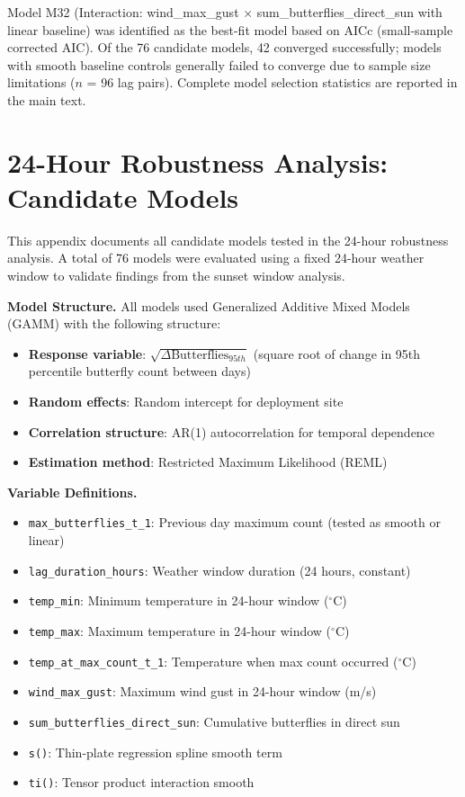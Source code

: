 \documentclass[insects,article,submit,pdftex,moreauthors]{Definitions/mdpi}
\begin{document}
\begin{appendix}
Model M32 (Interaction: wind\_max\_gust $\times$ sum\_butterflies\_direct\_sun with linear baseline) was identified as the best-fit model based on AICc (small-sample corrected AIC). Of the 76 candidate models, 42 converged successfully; models with smooth baseline controls generally failed to converge due to sample size limitations ($n$ = 96 lag pairs). Complete model selection statistics are reported in the main text.

\section{24-Hour Robustness Analysis: Candidate Models}
\label{app:24hr_models}

This appendix documents all candidate models tested in the 24-hour robustness analysis. A total of 76 models were evaluated using a fixed 24-hour weather window to validate findings from the sunset window analysis.

\textbf{Model Structure.}
All models used Generalized Additive Mixed Models (GAMM) with the following structure:
\begin{itemize}
\item \textbf{Response variable}: $\sqrt{\Delta\text{Butterflies}_{95th}}$ (square root of change in 95th percentile butterfly count between days)
\item \textbf{Random effects}: Random intercept for deployment site
\item \textbf{Correlation structure}: AR(1) autocorrelation for temporal dependence
\item \textbf{Estimation method}: Restricted Maximum Likelihood (REML)
\end{itemize}

\textbf{Variable Definitions.}
\begin{itemize}
\item \texttt{max\_butterflies\_t\_1}: Previous day maximum count (tested as smooth or linear)
\item \texttt{lag\_duration\_hours}: Weather window duration (24 hours, constant)
\item \texttt{temp\_min}: Minimum temperature in 24-hour window ($^\circ$C)
\item \texttt{temp\_max}: Maximum temperature in 24-hour window ($^\circ$C)
\item \texttt{temp\_at\_max\_count\_t\_1}: Temperature when max count occurred ($^\circ$C)
\item \texttt{wind\_max\_gust}: Maximum wind gust in 24-hour window (m/s)
\item \texttt{sum\_butterflies\_direct\_sun}: Cumulative butterflies in direct sun
\item \texttt{s()}: Thin-plate regression spline smooth term
\item \texttt{ti()}: Tensor product interaction smooth
\end{itemize}


\end{appendix}
\end{document}
